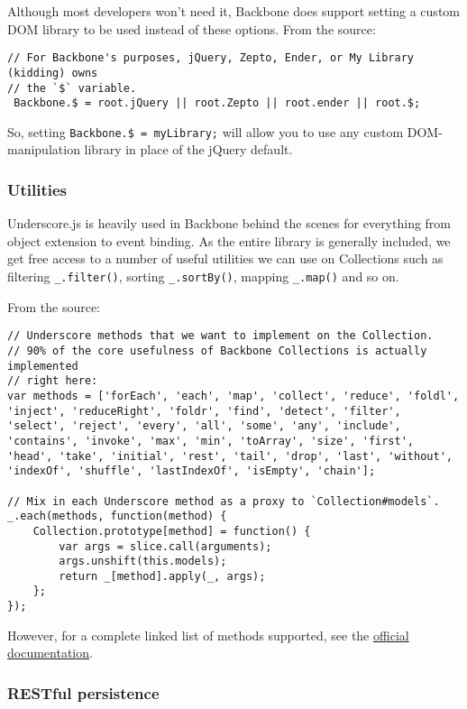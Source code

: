 \documentclass[9pt]{book}
\begin{document}
Although most developers won't need it, Backbone does support setting a
custom DOM library to be used instead of these options. From the source:

\begin{verbatim}
// For Backbone's purposes, jQuery, Zepto, Ender, or My Library (kidding) owns
// the `$` variable.
 Backbone.$ = root.jQuery || root.Zepto || root.ender || root.$;
\end{verbatim}

So, setting \texttt{Backbone.\$ = myLibrary;} will allow you to use any
custom DOM-manipulation library in place of the jQuery default.

\subsubsection{Utilities}\label{utilities}

Underscore.js is heavily used in Backbone behind the scenes for
everything from object extension to event binding. As the entire library
is generally included, we get free access to a number of useful
utilities we can use on Collections such as filtering
\texttt{\_.filter()}, sorting \texttt{\_.sortBy()}, mapping
\texttt{\_.map()} and so on.

From the source:

\begin{verbatim}
// Underscore methods that we want to implement on the Collection.
// 90% of the core usefulness of Backbone Collections is actually implemented
// right here:
var methods = ['forEach', 'each', 'map', 'collect', 'reduce', 'foldl', 'inject', 'reduceRight', 'foldr', 'find', 'detect', 'filter', 'select', 'reject', 'every', 'all', 'some', 'any', 'include', 'contains', 'invoke', 'max', 'min', 'toArray', 'size', 'first', 'head', 'take', 'initial', 'rest', 'tail', 'drop', 'last', 'without', 'indexOf', 'shuffle', 'lastIndexOf', 'isEmpty', 'chain'];

// Mix in each Underscore method as a proxy to `Collection#models`.
_.each(methods, function(method) {
    Collection.prototype[method] = function() {
        var args = slice.call(arguments);
        args.unshift(this.models);
        return _[method].apply(_, args);
    };
});
\end{verbatim}

However, for a complete linked list of methods supported, see the
\href{http://backbonejs.org/\#Collection-Underscore-Methods}{official
documentation}.

\subsubsection{RESTful persistence}\label{restful-persistence-1}
\end{document}
